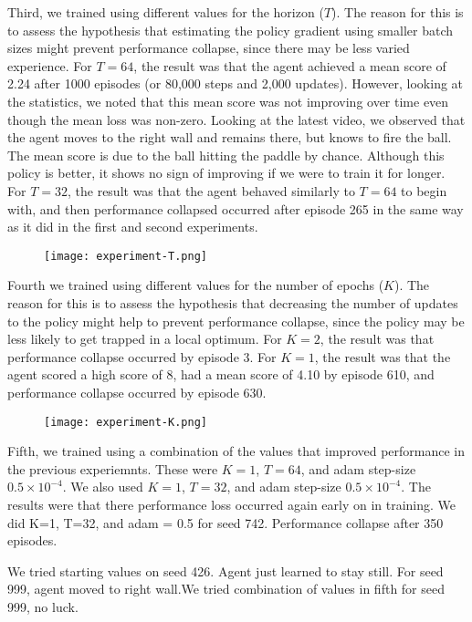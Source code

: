 \documentclass[12pt,a4paper]{article}
\begin{document}
Third, we trained using different values for the horizon ($T$). The reason for this is to assess the hypothesis that estimating the policy gradient using smaller batch sizes might prevent performance collapse, since there may be less varied experience. For $T=64$, the result was that the agent achieved a mean score of 2.24 after 1000 episodes (or 80,000 steps and 2,000 updates). However, looking at the statistics, we noted that this mean score was not improving over time even though the mean loss was non-zero. Looking at the latest video, we observed that the agent moves to the right wall and remains there, but knows to fire the ball. The mean score is due to the ball hitting the paddle by chance. Although this policy is better, it shows no sign of improving if we were to train it for longer. For $T=32$, the result was that the agent behaved similarly to $T=64$ to begin with, and then performance collapsed occurred after episode 265 in the same way as it did in the first and second experiments.

\begin{figure}[h]
\centering
\texttt{[image: experiment-T.png]}
\end{figure}

Fourth we trained using different values for the number of epochs ($K$). The reason for this is to assess the hypothesis that decreasing the number of updates to the policy might help to prevent performance collapse, since the policy may be less likely to get trapped in a local optimum. For $K=2$, the result was that performance collapse occurred by episode 3. For $K=1$, the result was that the agent scored a high score of 8, had a mean score of 4.10 by episode 610, and performance collapse occurred by episode 630. 

\begin{figure}[h]
    \centering
    \texttt{[image: experiment-K.png]}
\end{figure}

Fifth, we trained using a combination of the values that improved performance in the previous experiemnts. These were $K=1$, $T=64$, and adam step-size $0.5 \times 10^{-4}$. We also used $K=1$, $T=32$, and adam step-size $0.5 \times 10^{-4}$. The results were that there performance loss occurred again early on in training. We did K=1, T=32, and adam = 0.5 for seed 742. Performance collapse after 350 episodes.

We tried starting values on seed 426. Agent just learned to stay still. For seed 999, agent moved to right wall.We tried combination of values in fifth for seed 999, no luck.
\end{document}
